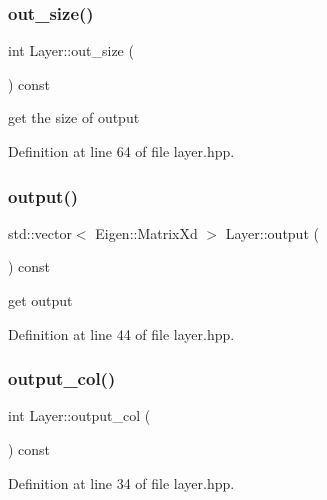 \mbox{\label{class_layer_a10515e993c8de900ad32fa1884b5915f}} 
\subsubsection{\texorpdfstring{out\+\_\+size()}{out\_size()}}
{\footnotesize\ttfamily int Layer\+::out\+\_\+size (\begin{DoxyParamCaption}{ }\end{DoxyParamCaption}) const}



get the size of output 



Definition at line 64 of file layer.\+hpp.

\mbox{\label{class_layer_ad5ba1424bab1b683bf2e1894768ded90}} 
\subsubsection{\texorpdfstring{output()}{output()}}
{\footnotesize\ttfamily std\+::vector$<$ Eigen\+::\+Matrix\+Xd $>$ Layer\+::output (\begin{DoxyParamCaption}{ }\end{DoxyParamCaption}) const}



get output 



Definition at line 44 of file layer.\+hpp.

\mbox{\label{class_layer_a81ddf9b360d331527813547112c146da}} 
\subsubsection{\texorpdfstring{output\+\_\+col()}{output\_col()}}
{\footnotesize\ttfamily int Layer\+::output\+\_\+col (\begin{DoxyParamCaption}{ }\end{DoxyParamCaption}) const}



Definition at line 34 of file layer.\+hpp.

